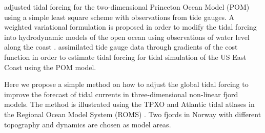 \cite{chen99} adjusted tidal forcing for the two-dimensional Princeton Ocean Model (POM) using a simple least square scheme with observations from tide gauges. A weighted variational formulation is proposed in order to modify the tidal forcing into hydrodynamic models of the open ocean using observations of water level along the coast \cite[]{bennett82}. \cite{zhang03} assimilated tide gauge data through gradients of the cost function in order to estimate tidal forcing for tidal simulation of the US East Coast using the POM model. 

Here we propose a simple method on how to adjust the global tidal forcing to improve the forecast of tidal currents in three-dimensional non-linear fjord models. The method is illustrated using the TPXO and Atlantic tidal atlases \cite[]{egbert94,egbert02} in the Regional Ocean Model System (ROMS) \cite[]{shchepetkin05,shchepetkin09,haidvogel08}. Two fjords in Norway with different topography and dynamics are chosen as model areas. 
